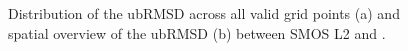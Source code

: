 \begin{figure}[ht!]
\centering
\begin{minipage}[c]{0.34\textwidth}
    \centering
    \subcaption{} %
\end{minipage}%
\hfill
\begin{minipage}[c]{0.64\textwidth}
    \centering
    \subcaption{} %
\end{minipage}
\caption{Distribution of the \ac{ubRMSD} across all valid grid points (a) and spatial overview of the \ac{ubRMSD} (b) between \ac{SMOS} \ac{L2} and \runrefname.}
\label{fig:urmsd\runidx}
\end{figure}
